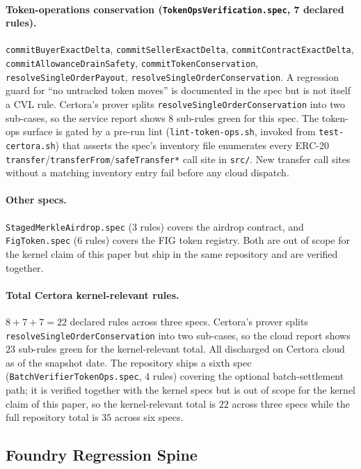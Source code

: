 \documentclass[11pt,a4paper]{article}
\theoremstyle{definition}
\theoremstyle{remark}
\begin{document}
\paragraph{Token-operations conservation (\texttt{TokenOpsVerification.spec}, 7 declared rules).}
\texttt{commitBuyerExactDelta},
\texttt{commitSellerExactDelta},
\texttt{commitContractExactDelta},
\texttt{commitAllowanceDrainSafety},
\texttt{commitTokenConservation},
\texttt{resolveSingleOrderPayout},
\texttt{resolveSingleOrderConservation}.
A regression guard for ``no untracked token moves'' is documented in
the spec but is not itself a CVL rule. Certora's prover splits
\texttt{resolveSingleOrderConservation} into two sub-cases, so the
service report shows 8 sub-rules green for this spec.
The token-ops surface is gated by a pre-run lint
(\texttt{lint-token-ops.sh}, invoked from \texttt{test-certora.sh})
that asserts the spec's inventory file enumerates every ERC-20
\texttt{transfer}/\texttt{transferFrom}/\texttt{safeTransfer*} call
site in \texttt{src/}. New transfer call sites without a matching
inventory entry fail before any cloud dispatch.

\paragraph{Other specs.}
\texttt{StagedMerkleAirdrop.spec} (3 rules) covers the airdrop
contract, and \texttt{FigToken.spec} (6 rules) covers the FIG token
registry. Both are out of scope for the kernel claim of this paper
but ship in the same repository and are verified together.

\paragraph{Total Certora kernel-relevant rules.}
$8 + 7 + 7 = 22$ declared rules across three specs. Certora's prover
splits \texttt{resolveSingleOrderConservation} into two sub-cases, so
the cloud report shows $23$ sub-rules green for the kernel-relevant
total. All discharged on Certora cloud as of the snapshot date. The
repository ships a sixth spec
(\texttt{BatchVerifierTokenOps.spec}, $4$ rules) covering the optional
batch-settlement path; it is verified together with the kernel
specs but is out of scope for the kernel claim of this paper, so
the kernel-relevant total is $22$ across three specs while the
full repository total is $35$ across six specs.

\subsection{Foundry Regression Spine}
\end{document}

